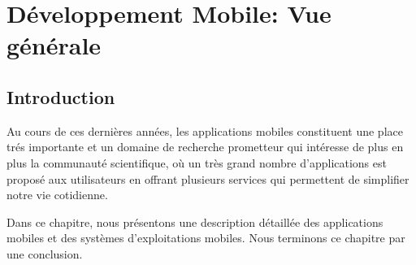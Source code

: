 \documentclass[french,a4,12pt]{report}
\begin{document}

\pagestyle{fancy}
\chapter{Développement Mobile: Vue	générale }
\chead{}
\lhead{\bfseries \chaptername {\,} \thechapter }
\cfoot{\bfseries \thepage}
\rhead{}

\begin{tcolorbox}[leftrule=3mm]
\section{Introduction}
\end{tcolorbox}
\quad  \textsf{Au cours de ces dernières années, les applications mobiles constituent une place trés importante et un domaine de recherche prometteur qui intéresse de plus en plus la communauté scientifique, où un très grand nombre d'applications est proposé aux utilisateurs en offrant plusieurs services qui permettent de simplifier notre vie cotidienne.}



\quad \textsf{Dans ce chapitre, nous présentons une description détaillée des applications mobiles et  des systèmes d'exploitations mobiles. Nous terminons ce chapitre par une conclusion.}
\end{document}
